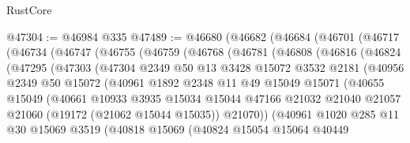 \begin{lexlean}{RustCore}
\begin{coremodule}
@47304 := @46984 @335
@47489 := @46680
    (@46682
      (@46684
        (@46701
          (@46717
            (@46734
              (@46747
                (@46755
                  (@46759
                    (@46768
                      (@46781
                        (@46808
                          (@46816
                            (@46824
                              (@47295
                                (@47303
                                  (@47304
                                    @2349
                                    @50
                                    @13
                                    @3428
                                    @15072
                                    @3532
                                    @2181
                                    (@40956
                                      @2349
                                      @50
                                      @15072
                                      (@40961
                                        @1892
                                        @2348
                                        @11
                                        @49
                                        @15049
                                        @15071
                                        (@40655
                                          @15049
                                          (@40661
                                            @10933
                                            @3935
                                            @15034
                                            @15044
                                            @47166
                                            @21032
                                            @21040
                                            @21057
                                            @21060
                                            (@19172 (@21062 @15044 @15035))
                                            @21070))
                                        (@40961
                                          @1020
                                          @285
                                          @11
                                          @30
                                          @15069
                                          @3519
                                          (@40818
                                            @15069
                                            (@40824
                                              @15054
                                              @15064
                                              @40449

\end{coremodule}
\end{lexlean}
